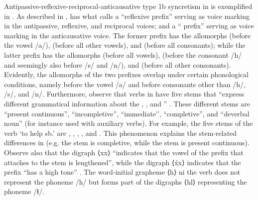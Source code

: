 Antipassive-reflexive-reciprocal-anticausative type 1b syncretism in  is exemplified in . As described in ,  has what \citet[343, 347]{montgomery-anderson:2008} calls a “reflexive prefix”  serving as voice marking in the antipassive, reflexive, and reciprocal voices; and a “ prefix”  serving as voice marking in the anticausative voice. The former prefix has the allomorphs  (before the vowel /a/),  (before all other vowels), and  (before all consonants); while the latter prefix has the allomorphs  (before all vowels),  (before the consonant /h/ and seemingly also before /s/ and /n/), and  (before all other consonants). Evidently, the allomorphs of the two prefixes overlap under certain phonological conditions, namely before the vowel /a/ and before consonants other than /h/, /s/, and /n/. Furthermore, observe that verbs in  have five stems that “express different grammatical information about the , , and ” \citep[252]{montgomery-anderson:2008}. These different stems are “present continuous”, “incompletive”, “immediate”, “completive”, and “deverbal noun” (for instance used with auxiliary verbs). For example, the five stems of the verb ‘to help sb.’ are , , , , and  \citep[224f.]{montgomery-anderson:2008}. This phenomenon explains the stem-related differences in  (e.g. the stem  is completive, while the stem  is present continuous). Observe also that the digraph ⟨xx⟩ “indicates that the vowel of the prefix that attaches to the stem is lengthened”, while the digraph ⟨x́x⟩ indicates that the prefix “has a high tone” \citep[xii]{montgomery-anderson:2008}. The word-initial grapheme ⟨h⟩ ni the verb   does not represent the phoneme /h/ but forms part of the digraphs ⟨hl⟩ representing the phoneme /ɬ/.


